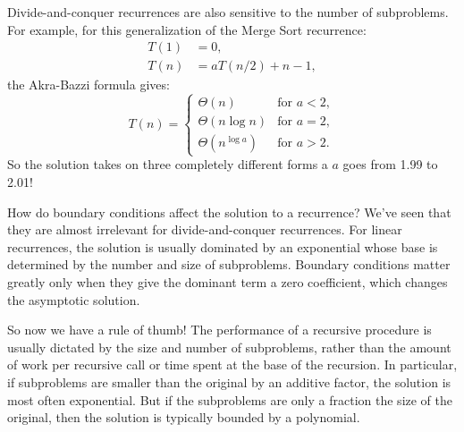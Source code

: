 Divide-and-conquer recurrences are also sensitive to the number of
subproblems.  For example, for this generalization of the Merge Sort
recurrence:
\begin{align*}
T(1) & = 0, \\
T(n) & = a T(n/2) + n - 1,
\end{align*}
the Akra-Bazzi formula gives:
\begin{equation*}
T(n) = \begin{cases}
\Theta(n) & \text{for $a < 2$}, \\
\Theta(n \log n) & \text{for $a = 2$}, \\
\Theta(n^{\log a}) & \text{for $a > 2$}.
\end{cases}
\end{equation*}
So the solution takes on three completely different forms a $a$ goes
from 1.99 to 2.01!

How do boundary conditions affect the solution to a recurrence?  We've
seen that they are almost irrelevant for divide-and-conquer
recurrences.  For linear recurrences, the solution is usually
dominated by an exponential whose base is determined by the number and
size of subproblems.  Boundary conditions matter greatly only when
they give the dominant term a zero coefficient, which changes the
asymptotic solution.

So now we have a rule of thumb!  The performance of a recursive
procedure is usually dictated by the size and number of subproblems,
rather than the amount of work per recursive call or time spent at the
base of the recursion.  In particular, if subproblems are smaller than
the original by an additive factor, the solution is most often
exponential.  But if the subproblems are only a fraction the size of
the original, then the solution is typically bounded by a polynomial.

\endinput

